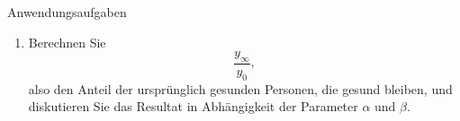 \begin{ueb}{Anwendungsaufgaben}{}
\begin{enumerate}
\begin{enumerate}
                  \item Berechnen Sie
                        \[
                            \frac{y_\infty}{y_0},
                        \]
                        also den Anteil der ursprünglich gesunden Personen,
                        die gesund bleiben, und diskutieren Sie das Resultat
                        in Abhängigkeit der Parameter \(\alpha\) und \(\beta\).
              \end{enumerate}









    \end{enumerate}

\end{ueb}

